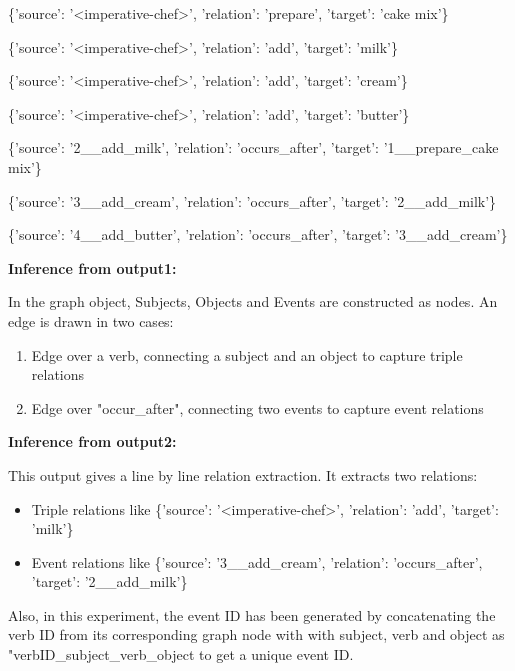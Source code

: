 \documentclass[11pt,letterpaper]{article}
\begin{document}
\begin{flushleft}
\{'source': '<imperative-chef>', 'relation': 'prepare', 'target': 'cake mix'\}

\{'source': '<imperative-chef>', 'relation': 'add', 'target': 'milk'\}

\{'source': '<imperative-chef>', 'relation': 'add', 'target': 'cream'\}

\{'source': '<imperative-chef>', 'relation': 'add', 'target': 'butter'\}

\{'source': '2\_<imperative-chef>\_add\_milk', 'relation': 'occurs\_after', 'target': '1\_<imperative-chef>\_prepare\_cake mix'\}

\{'source': '3\_<imperative-chef>\_add\_cream', 'relation': 'occurs\_after', 'target': '2\_<imperative-chef>\_add\_milk'\}

\{'source': '4\_<imperative-chef>\_add\_butter', 'relation': 'occurs\_after', 'target': '3\_<imperative-chef>\_add\_cream'\}

\end{flushleft}
\noindent 
\textbf{Inference from output1:} 

In the graph object, Subjects, Objects and Events are constructed as nodes. An edge is drawn in two cases:
\begin{enumerate}
    \item Edge over a verb, connecting a subject and an object to capture triple relations
    \item Edge over "occur\_after", connecting two events to capture event relations
\end{enumerate}
\noindent 
\textbf{Inference from output2:} 

This output gives a line by line relation extraction. It extracts two relations:

\begin{itemize}
    \item Triple relations like \{'source': '<imperative-chef>', 'relation': 'add', 'target': 'milk'\}
    \item Event relations like \{'source': '3\_<imperative-chef>\_add\_cream', 'relation': 'occurs\_after', 'target': '2\_<imperative-chef>\_add\_milk'\}
    
\end{itemize}
\noindent \newline
Also, in this experiment, the event ID has been generated by concatenating the verb ID from its corresponding graph node with with subject, verb and object as "verbID\_subject\_verb\_object to get a unique event ID.
\end{document}
